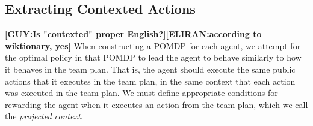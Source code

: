 \documentclass[letterpaper]{article} %
\newcommand{\eliran}[1]{\textbf{[\color{red}ELIRAN:#1]}}
\newcommand{\ronen}[1]{\textbf{[\color{blue}RONEN:#1]}}
\newcommand{\guy}[1]{\textbf{[\color{orange}GUY:#1]}}
\begin{document}

\subsection{Extracting Contexted Actions}
\guy{Is "contexted" proper English?}\eliran{according to wiktionary, yes}
When constructing a POMDP for each agent, we attempt for the optimal policy in that POMDP to lead the agent to behave similarly to how it behaves in the team plan. That is, the agent should execute the same public actions that it executes in the team plan, in the same context that each action was executed in the team plan. We must define appropriate conditions for rewarding the agent when it executes an action from the team plan, which we
call the \emph{projected context}. 
\end{document}
